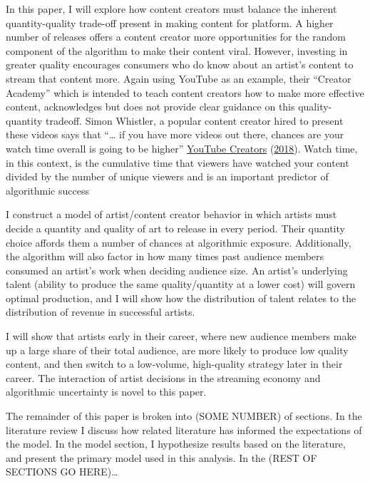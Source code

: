 \documentclass[
]{article}
\begin{document}
In this paper, I will explore how content creators must balance the
inherent quantity-quality trade-off present in making content for
platform. A higher number of releases offers a content creator more
opportunities for the random component of the algorithm to make their
content viral. However, investing in greater quality encourages
consumers who do know about an artist's content to stream that content
more. Again using YouTube as an example, their ``Creator Academy'' which
is intended to teach content creators how to make more effective
content, acknowledges but does not provide clear guidance on this
quality-quantity tradeoff. Simon Whistler, a popular content creator
hired to present these videos says that ``\ldots{} if you have more
videos out there, chances are your watch time overall is going to be
higher''
\protect\hyperlink{ref-youtubecreatorsWhatIdealVideo2018}{YouTube
Creators}
(\protect\hyperlink{ref-youtubecreatorsWhatIdealVideo2018}{2018}). Watch
time, in this context, is the cumulative time that viewers have watched
your content divided by the number of unique viewers and is an important
predictor of algorithmic success

I construct a model of artist/content creator behavior in which artists
must decide a quantity and quality of art to release in every period.
Their quantity choice affords them a number of chances at algorithmic
exposure. Additionally, the algorithm will also factor in how many times
past audience members consumed an artist's work when deciding audience
size. An artist's underlying talent (ability to produce the same
quality/quantity at a lower cost) will govern optimal production, and I
will show how the distribution of talent relates to the distribution of
revenue in successful artists.

I will show that artists early in their career, where new audience
members make up a large share of their total audience, are more likely
to produce low quality content, and then switch to a low-volume,
high-quality strategy later in their career. The interaction of artist
decisions in the streaming economy and algorithmic uncertainty is novel
to this paper.

The remainder of this paper is broken into (SOME NUMBER) of sections. In
the literature review I discuss how related literature has informed the
expectations of the model. In the model section, I hypothesize results
based on the literature, and present the primary model used in this
analysis. In the (REST OF SECTIONS GO HERE)\ldots{}
\end{document}
